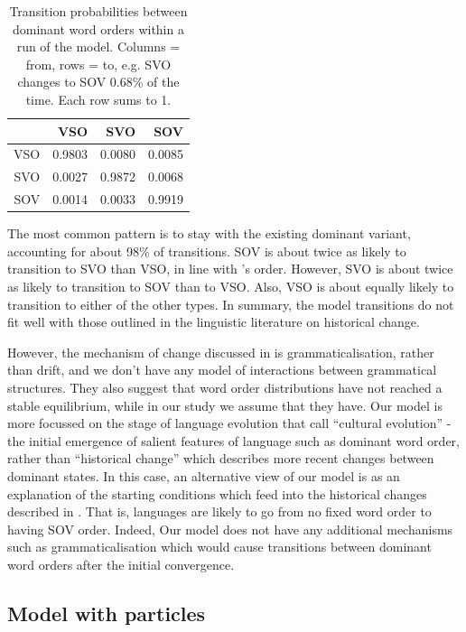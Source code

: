 \documentclass[12pt]{article}
\begin{document}
\begin{table}[ht]
\centering
\begin{tabular}{rrrr}
  \hline
 & VSO & SVO & SOV \\ 
  \hline
VSO & 0.9803 & 0.0080 & 0.0085 \\ 
  SVO & 0.0027 & 0.9872 & 0.0068 \\ 
  SOV & 0.0014 & 0.0033 & 0.9919 \\ 
   \hline
\end{tabular}
\caption{Transition probabilities between dominant word orders within a run of the model.  Columns = from, rows = to, e.g. SVO changes to SOV 0.68\% of the time.  Each row sums to 1.}
\end{table}

The most common pattern is to stay with the existing dominant variant, accounting for about 98\% of transitions.  SOV is about twice as likely to transition to SVO than VSO, in line with \citeauthor{gell2011origin}'s order. However, SVO is about twice as likely to transition to SOV than to VSO.  Also, VSO is about equally likely to transition to either of the other types.  In summary, the model transitions do not fit well with those outlined in the linguistic literature on historical change.

However, the mechanism of change discussed in \citeauthor{gell2011origin} is grammaticalisation, rather than drift, and we don't have any model of interactions between grammatical structures.  They also suggest that word order distributions have not reached a stable equilibrium, while in our study we assume that they have.  Our model is more focussed on the stage of language evolution that \cite{Scott-Phillips_Kirby_2010} call ``cultural evolution'' - the initial emergence of salient features of language such as dominant word order, rather than ``historical change'' which describes more recent changes between dominant states.  In this case, an alternative view of our model is as an explanation of the starting conditions which feed into the historical changes described in \citeauthor{gell2011origin}.  That is, languages are likely to go from no fixed word order to having SOV order.  Indeed, Our model does not have any additional mechanisms such as grammaticalisation which would cause transitions between dominant word orders after the initial convergence.

\subsection{Model with particles}
\end{document}
